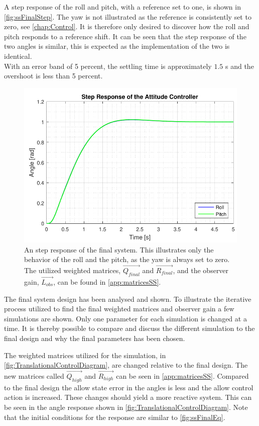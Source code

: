 A step response of the roll and pitch, with a reference set to one, is shown in \autoref{fig:ssFinalStep}. The yaw is not illustrated as the reference is consistently set to zero, see \autoref{chap:Control}. It is therefore only desired to discover how the roll and pitch responds to a reference shift. It can be seen that the step response of the two angles is similar, this is expected as the implementation of the two is identical. \\ With an error band of 5 percent, the settling time is approximately $1.5$ \si{s} and the overshoot is less than 5 percent. 

\begin{figure}[H]
	\centering
	\includegraphics[scale=0.8]{figures/ssFinalStep.pdf}
	\caption{An step response of the final system. This illustrates only the behavior of the roll and the pitch, as the yaw is always set to zero. The utilized weighted matrices, $\vec{Q_{final}}$ and $\vec{R_{final}}$, and the observer gain, $\vec{L_{obs}}$, can be found in \autoref{app:matricesSS}.}
	\label{fig:ssFinalStep}
\end{figure}

The final system design has been analysed and shown. To illustrate the iterative process utilized to find the final weighted matrices and observer gain a few simulations are shown. Only one parameter for each simulation is changed at a time. It is thereby possible to compare and discuss the different simulation to the final design and why the final parameters has been chosen.

The weighted matrices utilized for the simulation, in \autoref{fig:TranslationalControlDiagram}, are changed relative to the final design. The new matrices called $\vec{Q_{high}}$ and $\vec{R_{high}}$ can be seen in \autoref{app:matricesSS}. Compared to the final design the allow state error in the angles is less and the allow control action is increased. These changes should yield a more reactive system. This can be seen in the angle response shown in \autoref{fig:TranslationalControlDiagram}. Note that the initial conditions for the response are similar to \autoref{fig:ssFinalEq}.

